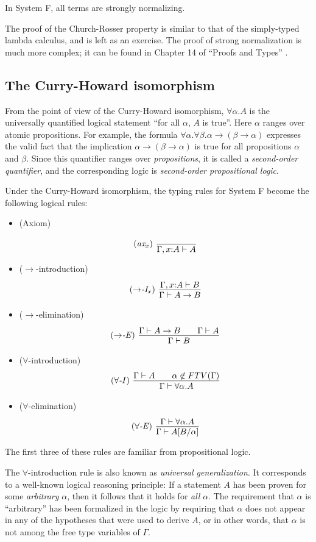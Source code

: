 \documentclass{article}
\begin{document}
\begin{theorem}\label{thm-strong-norm-system-f}
  In System F, all terms are strongly normalizing.
\end{theorem}

The proof of the Church-Rosser property is similar to that of the
simply-typed lambda calculus, and is left as an exercise. The proof of
strong normalization is much more complex; it can be found in Chapter
14 of ``Proofs and Types'' {\cite{GLT89}}.

\subsection{The Curry-Howard isomorphism}

From the point of view of the Curry-Howard isomorphism,
$\forall\alpha.A$ is the universally quantified logical statement
``for all $\alpha$, $A$ is true''. Here $\alpha$ ranges over atomic
propositions. For example, the formula
$\forall\alpha.\forall\beta.\alpha\to(\beta\to\alpha)$ expresses the
valid fact that the implication $\alpha\to(\beta\to\alpha)$ is true
for all propositions $\alpha$ and $\beta$. Since this quantifier
ranges over {\em propositions}, it is called a {\em second-order
  quantifier}, and the corresponding logic is {\em second-order
  propositional logic}. 

Under the Curry-Howard isomorphism, the typing rules for System F
become the following logical rules:
\begin{itemize}
\item (Axiom)
\[ \trule{ax$_x$}\ \deriv{}{\Gamma,\typ{x}{A}\tj A}
\]
\item ($\to$-introduction)
\[ \trule{$\to$-I$_x$}\ \deriv{\Gamma,\typ{x}{A}\tj B}{\Gamma\tj A\to B}
\]
\item ($\to$-elimination)
\[ \trule{$\to$-E}\ \deriv{\Gamma\tj A\to B\sep \Gamma\tj A}{\Gamma\tj B}
\]
\item ($\forall$-introduction)
\[ \trule{$\forall$-I}\ \deriv{\Gamma\tj A\sep \alpha\not\in\FTV{\Gamma}}{\Gamma\tj \forall\alpha.A}
\]
\item ($\forall$-elimination)
\[ \trule{$\forall$-E}\ \deriv{\Gamma\tj \forall\alpha.A}{\Gamma\tj A[B/\alpha]}
\]
\end{itemize}
The first three of these rules are familiar from propositional
logic. 

The $\forall$-introduction rule is also known as {\em universal
  generalization}. It corresponds to a well-known logical reasoning
principle: If a statement $A$ has been proven for some {\em arbitrary}
$\alpha$, then it follows that it holds for {\em all} $\alpha$. The
requirement that $\alpha$ is ``arbitrary'' has been formalized in the
logic by requiring that $\alpha$ does not appear in any of the
hypotheses that were used to derive $A$, or in other words, that
$\alpha$ is not among the free type variables of $\Gamma$.
\end{document}
